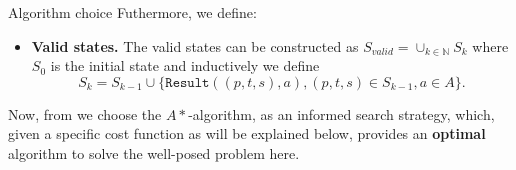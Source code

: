 \begin{section}{Algorithm choice}
Futhermore, we define:
\begin{itemize}
  
\item \textbf{Valid states.} The valid states can be constructed as 
  $S_{valid} = \cup_{k\in \mathbb{N}}S_k$ where $S_0$ is the initial state and inductively we define
  \begin{equation*}
    S_k = S_{k-1}\cup \{\texttt{Result}((p,t,s),a), (p,t,s)\in S_{k-1}, a\in A \}.
  \end{equation*}
\end{itemize}

Now, from \cite{rn} we choose the $A*$-algorithm, as an informed search strategy, which, given a specific cost function as will be explained below, provides an \textbf{optimal} algorithm to solve the well-posed problem here.
\end{section}